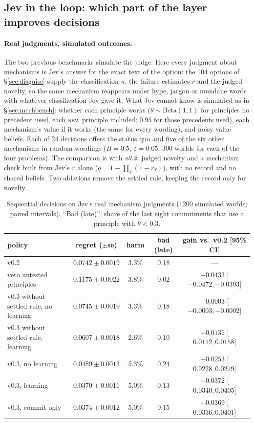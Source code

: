 \documentclass[11pt]{article}
\theoremstyle{definition}
\begin{document}
\subsection{Jev in the loop: which part of the layer improves decisions}\label{sec:jevloop}

\paragraph{Real judgments, simulated outcomes.} The two previous benchmarks simulate the judge. Here
every judgment about mechanisms is Jev's answer for the exact text of the option: the 104 options of
\S\ref{sec:disguise} supply the classification $\pi$, the failure estimates $r$ and the judged novelty,
so the same mechanism reappears under hype, jargon or mundane words with whatever classification Jev
gave it. What Jev cannot know is simulated as in \S\ref{sec:mechbench}: whether each principle works
($\theta\sim\mathrm{Beta}(1,1)$ for principles no precedent used, each \textsc{new} principle included;
$0.95$ for those precedents used), each mechanism's value if it works (the same for every wording),
and noisy value beliefs. Each of 24 decisions offers the status quo and five of the six other
mechanisms in random wordings ($B=0.5$, $\varepsilon=0.05$; 300 worlds for each of the four problems).
The comparison is with \emph{v0.2}: judged novelty and a mechanism check built from Jev's $r$ alone
($q=1-\prod_f(1-r_f)$), with no record and no shared beliefs. Two ablations remove the settled rule,
keeping the record only for novelty.

\begin{table}[h]
\centering\small
\begin{tabular}{@{}lcccc@{}}
\toprule
policy & regret ($\pm$se) & harm & bad (late) & gain vs.\ v0.2 [95\% CI] \\
\midrule
v0.2 & $0.0742\pm0.0019$ & 3.3\% & 0.18 & --- \\
veto untested principles & $0.1175\pm0.0022$ & 3.8\% & 0.02 & $-0.0433$ [$-0.0472,-0.0393$] \\
v0.3 without settled rule, no learning & $0.0745\pm0.0019$ & 3.3\% & 0.18 & $-0.0003$ [$-0.0003,-0.0002$] \\
v0.3 without settled rule, learning & $0.0607\pm0.0018$ & 2.6\% & 0.10 & $+0.0135$ [$0.0112,0.0158$] \\
v0.3, no learning & $0.0489\pm0.0013$ & 5.3\% & 0.24 & $+0.0253$ [$0.0228,0.0279$] \\
v0.3, learning & $0.0370\pm0.0011$ & 5.0\% & 0.13 & $+0.0372$ [$0.0340,0.0405$] \\
v0.3, commit only & $0.0374\pm0.0012$ & 5.0\% & 0.15 & $+0.0369$ [$0.0336,0.0401$] \\
\bottomrule
\end{tabular}
\caption{Sequential decisions on Jev's real mechanism judgments (1200 simulated worlds; paired
intervals). ``Bad (late)'': share of the last eight commitments that use a principle with
$\theta<0.3$.}
\label{tab:jevloop}
\end{table}
\end{document}
